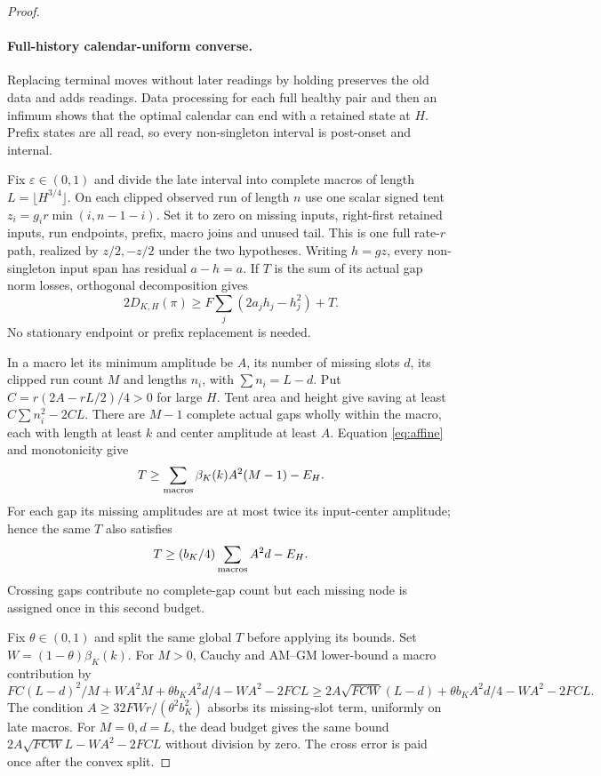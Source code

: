 \documentclass[11pt]{article}
\begin{document}
\begin{proof}
\paragraph{Full-history calendar-uniform converse.}
Replacing terminal moves without later readings by holding preserves the old
data and adds readings. Data processing for each full healthy pair and then
an infimum shows that the optimal calendar can end with a retained state
at $H$. Prefix states are all read, so every non-singleton interval is
post-onset and internal.

Fix $\varepsilon\in(0,1)$ and divide the late interval into complete macros
of length $L=\lfloor H^{3/4}\rfloor$.
On each clipped observed run of length $n$ use one scalar signed tent
$z_i=g_i r\min(i,n-1-i)$.
Set it to zero on missing inputs, right-first retained inputs, run endpoints,
prefix, macro joins and unused tail. This is one full rate-$r$ path, realized
by $z/2,-z/2$ under the two hypotheses.
Writing $h=gz$, every non-singleton input span has residual $a-h=a$.
If $T$ is the sum of its actual gap norm losses, orthogonal decomposition gives
\begin{equation}\label{eq:converse}
2D_{K,H}(\pi)\ge F\sum_j(2a_jh_j-h_j^2)+T .
\end{equation}
No stationary endpoint or prefix replacement is needed.

In a macro let its minimum amplitude be $A$, its number of missing slots $d$,
its clipped run count $M$ and lengths $n_i$, with $\sum n_i=L-d$.
Put $C=r(2A-rL/2)/4>0$ for large $H$.
Tent area and height give saving at least $C\sum n_i^2-2CL$.
There are $M-1$ complete actual gaps wholly within the macro, each with length
at least $k$ and center amplitude at least $A$.
Equation \eqref{eq:affine} and monotonicity give
\[
T\ge\sum_{\rm macros}\beta_K(k)A^2(M-1)-E_H.
\]
For each gap its missing amplitudes are at most twice its input-center
amplitude; hence the same $T$ also satisfies
\[
T\ge(b_K/4)\sum_{\rm macros}A^2d-E_H .
\]
Crossing gaps contribute no complete-gap count but each missing node is
assigned once in this second budget.

Fix $\theta\in(0,1)$ and split the same global $T$ before applying its bounds.
Set $W=(1-\theta)\beta_K(k)$.
For $M>0$, Cauchy and AM--GM lower-bound a macro contribution by
\[
FC(L-d)^2/M+WA^2M+\theta b_KA^2d/4-WA^2-2FCL
\ge2A\sqrt{FCW}(L-d)+\theta b_KA^2d/4-WA^2-2FCL.
\]
The condition $A\ge32FWr/(\theta^2b_K^2)$ absorbs its missing-slot term,
uniformly on late macros. For $M=0,d=L$, the dead budget gives the same
bound $2A\sqrt{FCW}L-WA^2-2FCL$ without division by zero.
The cross error is paid once after the convex split.


\end{proof}
\end{document}
